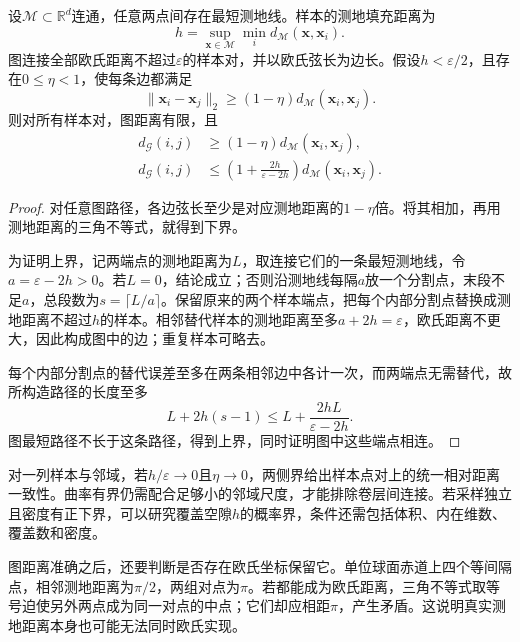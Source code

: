 \begin{theorem}[覆盖条件下的图距离界]
  \label{thm:dim-isomap-bound}
  设$\mathcal{M}\subset\mathbb{R}^d$连通，任意两点间存在最短测地线。样本的测地填充距离为
  \[
    h=\sup_{\bm{x}\in\mathcal{M}}\min_i
      d_{\mathcal{M}}(\bm{x},\bm{x}_i).
  \]
  图连接全部欧氏距离不超过$\varepsilon$的样本对，并以欧氏弦长为边长。假设$h<\varepsilon/2$，且存在$0\leq\eta<1$，使每条边都满足
  \[
    \lVert\bm{x}_i-\bm{x}_j\rVert_2
    \geq(1-\eta)d_{\mathcal{M}}(\bm{x}_i,\bm{x}_j).
  \]
  则对所有样本对，图距离有限，且
  \begin{equation}
    \label{eq:dim-isomap-bound}
    \begin{aligned}
      d_{\mathcal{G}}(i,j)
        &\geq(1-\eta)d_{\mathcal{M}}(\bm{x}_i,\bm{x}_j),\\
      d_{\mathcal{G}}(i,j)
        &\leq\left(1+\frac{2h}{\varepsilon-2h}\right)
          d_{\mathcal{M}}(\bm{x}_i,\bm{x}_j).
    \end{aligned}
  \end{equation}
\end{theorem}
\begin{proof}
  对任意图路径，各边弦长至少是对应测地距离的$1-\eta$倍。将其相加，再用测地距离的三角不等式，就得到下界。

  为证明上界，记两端点的测地距离为$L$，取连接它们的一条最短测地线，令$a=\varepsilon-2h>0$。若$L=0$，结论成立；否则沿测地线每隔$a$放一个分割点，末段不足$a$，总段数为$s=\lceil L/a\rceil$。保留原来的两个样本端点，把每个内部分割点替换成测地距离不超过$h$的样本。相邻替代样本的测地距离至多$a+2h=\varepsilon$，欧氏距离不更大，因此构成图中的边；重复样本可略去。

  每个内部分割点的替代误差至多在两条相邻边中各计一次，而两端点无需替代，故所构造路径的长度至多
  \[
    L+2h(s-1)
    \leq L+\frac{2hL}{\varepsilon-2h}.
  \]
  图最短路径不长于这条路径，得到上界，同时证明图中这些端点相连。
\end{proof}

对一列样本与邻域，若$h/\varepsilon\to0$且$\eta\to0$，两侧界给出样本点对上的统一相对距离一致性。曲率有界仍需配合足够小的邻域尺度，才能排除卷层间连接。若采样独立且密度有正下界，可以研究覆盖空隙$h$的概率界，条件还需包括体积、内在维数、覆盖数和密度。

图距离准确之后，还要判断是否存在欧氏坐标保留它。单位球面赤道上四个等间隔点，相邻测地距离为$\pi/2$，两组对点为$\pi$。若都能成为欧氏距离，三角不等式取等号迫使另外两点成为同一对点的中点；它们却应相距$\pi$，产生矛盾。这说明真实测地距离本身也可能无法同时欧氏实现。

